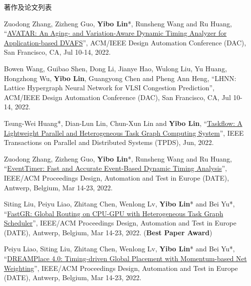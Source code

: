 \begin{rSection}{著作及论文列表}
\begin{description}[font=\normalfont, rightmargin=2em]
{}
            

\item[{[C93]}]{
        Zuodong Zhang, Zizheng Guo, \textbf{Yibo Lin}*, Runsheng Wang and Ru Huang, 
    ``\href{https://doi.org/10.1145/3489517.3530530}{AVATAR: An Aging- and Variation-Aware Dynamic Timing Analyzer for Application-based DVAFS}'', 
    ACM/IEEE Design Automation Conference (DAC), San Francisco, CA, Jul 10-14, 2022.
    
}
            

\item[{[C92]}]{
        Bowen Wang, Guibao Shen, Dong Li, Jianye Hao, Wulong Liu, Yu Huang, Hongzhong Wu, \textbf{Yibo Lin}, Guangyong Chen and Pheng Ann Heng, 
    ``LHNN: Lattice Hypergraph Neural Network for VLSI Congestion Prediction'', 
    ACM/IEEE Design Automation Conference (DAC), San Francisco, CA, Jul 10-14, 2022.
    
}
            

\item[{[J91]}]{
        Tsung-Wei Huang*, Dian-Lun Lin, Chun-Xun Lin and \textbf{Yibo Lin}, 
    ``\href{https://doi.org/10.1109/TPDS.2021.3104255}{Taskflow: A Lightweight Parallel and Heterogeneous Task Graph Computing System}'', 
    IEEE Transactions on Parallel and Distributed Systems (TPDS), Jun, 2022.
    
}
            

\item[{[C90]}]{
        Zuodong Zhang, Zizheng Guo, \textbf{Yibo Lin}*, Runsheng Wang and Ru Huang, 
    ``\href{https://doi.org/10.23919/DATE54114.2022.9774642}{EventTimer: Fast and Accurate Event-Based Dynamic Timing Analysis}'', 
    IEEE/ACM Proceedings Design, Automation and Test in Europe (DATE), Antwerp, Belgium, Mar 14-23, 2022.
    
}
            

\item[{[C89]}]{
        Siting Liu, Peiyu Liao, Zhitang Chen, Wenlong Lv, \textbf{Yibo Lin}* and Bei Yu*, 
    ``\href{https://doi.org/10.23919/DATE54114.2022.9774606}{FastGR: Global Routing on CPU-GPU with Heterogeneous Task Graph Scheduler}'', 
    IEEE/ACM Proceedings Design, Automation and Test in Europe (DATE), Antwerp, Belgium, Mar 14-23, 2022.
    (\textbf{Best Paper Award})
}
            

\item[{[C88]}]{
        Peiyu Liao, Siting Liu, Zhitang Chen, Wenlong Lv, \textbf{Yibo Lin}* and Bei Yu*, 
    ``\href{https://doi.org/10.23919/DATE54114.2022.9774725}{DREAMPlace 4.0: Timing-driven Global Placement with Momentum-based Net Weighting}'', 
    IEEE/ACM Proceedings Design, Automation and Test in Europe (DATE), Antwerp, Belgium, Mar 14-23, 2022.
    
}
\end{description}
\end{rSection}
